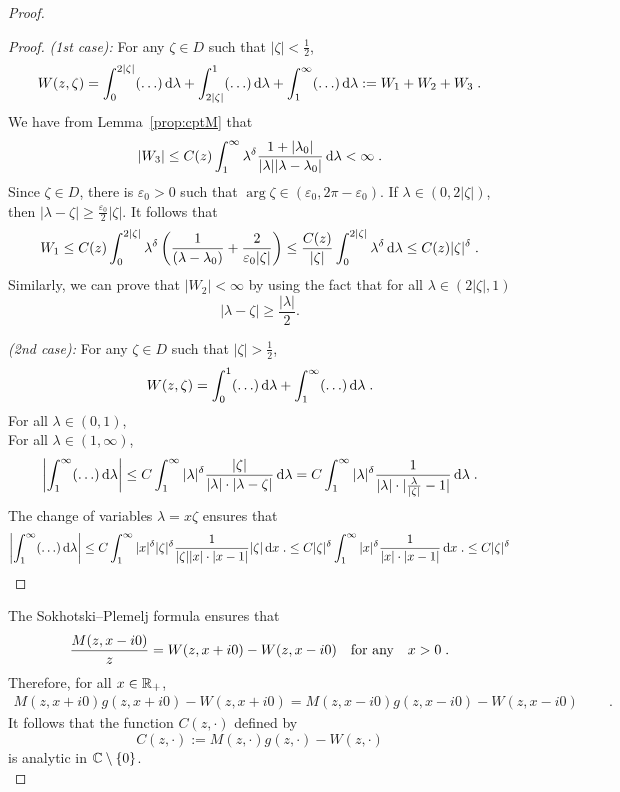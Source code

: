\documentclass[11pt]{amsart}
\newcommand{\diff}{\,\mathrm{d}}
\begin{document}
\begin{proof}
\begin{proof}
\textit{(1st case): }For any $\zeta \in D$ such that $|\zeta| < \frac{1}{2}$, 
\begin{align*}
    W(z, \zeta) = \int_0^{2|\zeta|} (\ldots)\diff \lambda + \int_{2|\zeta|}^1 (\ldots) \diff \lambda + \int_1^\infty (\ldots) \diff \lambda := W_1 + W_2 + W_3 \eqfinp
\end{align*}
We have from Lemma~\ref{prop:cptM} that
    $$ |W_3| \leq C(z) \int_1^\infty \lambda^\delta \frac{1+|\lambda_0|}{|\lambda||\lambda - \lambda_0|} \diff \lambda < \infty \eqfinp$$
Since $\zeta \in D$, there is $\varepsilon_0 > 0$ such that $\arg \zeta \in (\varepsilon_0, 2\pi - \varepsilon_0)$. If $\lambda \in (0, 2|\zeta|)$, then $|\lambda-\zeta| \geq \frac{\varepsilon_0}{2}|\zeta|$. It follows that 
    $$ W_1 \leq C(z)\int_0^{2|\zeta|} \lambda^\delta \left(\frac{1}{(\lambda-\lambda_0)}+ \frac{2}{\varepsilon_0 |\zeta|}\right) \leq \frac{C(z)}{|\zeta|} \int_0^{2|\zeta|} \lambda^\delta \diff \lambda \leq C(z)|\zeta|^\delta \eqfinp$$
Similarly, we can prove that $|W_2| < \infty$ by using the fact that for all $\lambda \in (2|\zeta|, 1)$ $$|\lambda-\zeta|\geq\frac{|\lambda|}{2}.$$

\textit{(2nd case):} For any $\zeta \in D$ such that $|\zeta| > \frac{1}{2}$, 
\begin{align*}
    W(z, \zeta) = \int_0^{1} (\ldots)\diff \lambda + \int_1^\infty (\ldots) \diff \lambda \eqfinp
\end{align*} 
For all $\lambda \in (0,1)$, \\
For all $\lambda \in (1, \infty)$, 
   $$\left| \int_1^\infty (\ldots) \diff \lambda \right|
   \leq C \int_1^\infty |\lambda|^\delta \frac{|\zeta|} {|\lambda|\cdot|\lambda-\zeta|} \diff \lambda  
   = C \int_1^\infty |\lambda|^\delta \frac{1} {|\lambda|\cdot|\frac{\lambda}{|\zeta|}-1|} \diff \lambda \eqfinp$$
The change of variables $\lambda = x \zeta$ ensures that 
    $$ 
    \left| \int_1^\infty (\ldots) \diff \lambda \right|
    \leq 
    C \int_1^\infty |x|^\delta |\zeta|^\delta \frac{1} {|\zeta||x|\cdot|x-1|} |\zeta|\diff x \eqfinp
    \leq 
    C |\zeta|^\delta \int_1^\infty |x|^\delta \frac{1}{|x|\cdot|x-1|}\diff x \eqfinp
    \leq C |\zeta|^\delta
    $$
\end{proof}

The Sokhotski--Plemelj formula ensures that 
\begin{align*}
    \frac{M(z,x-i0)}{z}
    = 
    W(z,x+i0) - W(z,x-i0)
    \quad \text{for any} \quad
    x > 0
    \; .
\end{align*}
Therefore, for all $x\in\mathbb{R}_+$, 
\begin{align*}
    M(z,x+i0)g(z, x+i0) -W(z,x+i0) = M(z,x-i0)g(z, x-i0) - W(z,x-i0) \, \qquad \text{}.
\end{align*}
It follows that the function $C(z,\cdot)$ defined by 
$$ C(z,\cdot) := M(z,\cdot)g(z,\cdot) - W(z,\cdot)$$
is analytic in $\mathbb{C} \setminus \{0\}$.\\



\end{proof}
\end{document}
